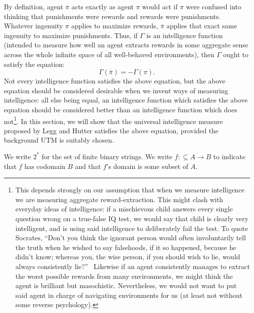 \documentclass{article}
\begin{document}
By definition, agent $\overline\pi$ acts exactly as agent $\pi$ would
act if $\pi$ were confused into thinking that punishments were rewards
and rewards were punishments.
Whatever ingenuity $\pi$ applies to maximize rewards,
$\overline\pi$ applies that exact same ingenuity to maximize punishments.
Thus, if $\Gamma$ is an intelligence function (intended to measure how
well an agent extracts rewards in some aggregate sense across the whole
infinite space of all well-behaved environments), then $\Gamma$ ought
to satisfy the equation:
\[
    \Gamma(\overline\pi) = -\Gamma(\pi).
\]
Not every intelligence function satisfies the above equation, but the
above equation should be considered desirable when we
invent ways of measuring intelligence: all else being equal, an
intelligence function which satisfies the above equation should be
considered better than an intelligence function which does
not\footnote{This depends strongly on our assumption that when we
measure intelligence we are measuring aggregate reward-extraction. This might clash
with everyday ideas of intelligence: if a mischievous child answers every single
question wrong on a true-false IQ test, we would say that child is clearly very
intelligent, and is using said intelligence to deliberately fail the test.
To quote Socrates, ``Don't you think the ignorant person would often involuntarily
tell the truth when he wished to say falsehoods, if it so happened, because he
didn't know; whereas you, the wise person, if you should wish to lie,
would always consistently lie?''\ \cite{lesserhippias}
Likewise if an agent consistently manages to extract the worst possible rewards
from many environments, we might think the agent is brilliant but
masochistic.
Nevertheless, we would not want to put said agent
in charge of navigating environments for us (at least not without some
reverse psychology).}.
In this section, we will show that the universal intelligence measure
proposed by Legg and Hutter satisfies the above equation, provided the
background UTM is suitably chosen.

We write $2^*$ for the set of finite binary strings.
We write $f:\subseteq A\to B$ to indicate that $f$ has codomain $B$
and that $f$'s domain is some subset of $A$.
\end{document}

